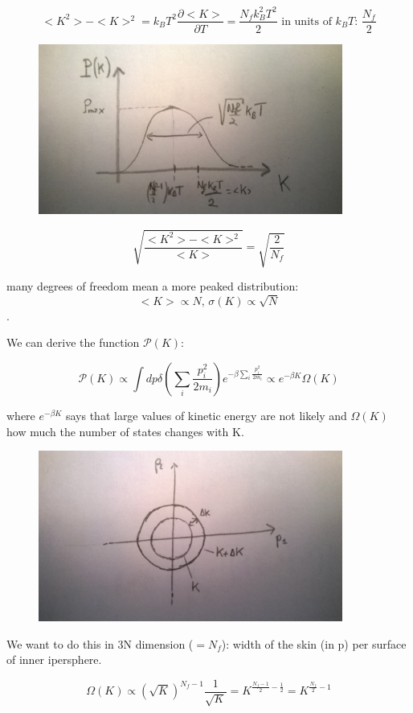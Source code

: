 \documentclass[a4paper, italian, openany]{book}
\begin{document}
$$<K^2> - <K>^2 = k_B T^2 \frac{\partial <K>}{\partial T} = \frac{N_f k_B^2 T^2}{2} \mbox{ in units of $k_B T$: } \frac{N_f}{2}$$

\begin{figure}[H]
\centering
\includegraphics[width=100mm]{img/pic10.jpg}
\end{figure}

$$\sqrt{\frac{<K^2> - <K>^2}{<K>}} = \sqrt{\frac{2}{N_f}}$$

many degrees of freedom mean a more peaked distribution: $$<K> \propto N \mbox{, } \sigma(K) \propto \sqrt{N}$$.

We can derive the function $\mathcal{P}(K)$:

$$\mathcal{P}(K) \propto \int dp \delta(\sum_i \frac{p_i^2}{2 m_i}) e^{-\beta \sum_i \frac{p_i^2}{2m_i}} \propto e^{-\beta K} \Omega(K)$$

where $e^{-\beta K}$ says that large values of kinetic energy are not likely and $\Omega(K)$ how much the number of states changes with K.

\begin{figure}[H]
\centering
\includegraphics[width=100mm]{img/pic11.jpg}
\end{figure}

We want to do this in 3N dimension ($= N_f$): width of the skin (in p) per surface of inner ipersphere.

$$\Omega(K) \propto (\sqrt{K})^{N_f -1} \frac{1}{\sqrt{K}} = K^{\frac{N_f -1}{2} - \frac{1}{2}} = K^{\frac{N_f}{2}-1}$$
\end{document}
